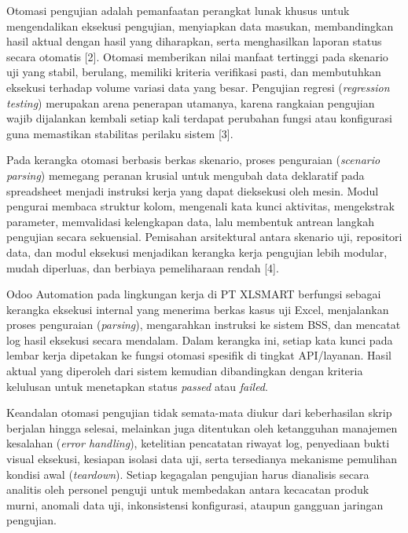 \documentclass[12pt,a4paper]{article}
\begin{document}
\clearpage
{}
Otomasi pengujian adalah pemanfaatan perangkat lunak khusus untuk mengendalikan eksekusi pengujian, menyiapkan data masukan, membandingkan hasil aktual dengan hasil yang diharapkan, serta menghasilkan laporan status secara otomatis [2]. Otomasi memberikan nilai manfaat tertinggi pada skenario uji yang stabil, berulang, memiliki kriteria verifikasi pasti, dan membutuhkan eksekusi terhadap volume variasi data yang besar. Pengujian regresi (\textit{regression testing}) merupakan arena penerapan utamanya, karena rangkaian pengujian wajib dijalankan kembali setiap kali terdapat perubahan fungsi atau konfigurasi guna memastikan stabilitas perilaku sistem [3].

Pada kerangka otomasi berbasis berkas skenario, proses penguraian (\textit{scenario parsing}) memegang peranan krusial untuk mengubah data deklaratif pada spreadsheet menjadi instruksi kerja yang dapat dieksekusi oleh mesin. Modul pengurai membaca struktur kolom, mengenali kata kunci aktivitas, mengekstrak parameter, memvalidasi kelengkapan data, lalu membentuk antrean langkah pengujian secara sekuensial. Pemisahan arsitektural antara skenario uji, repositori data, dan modul eksekusi menjadikan kerangka kerja pengujian lebih modular, mudah diperluas, dan berbiaya pemeliharaan rendah [4].

Odoo Automation pada lingkungan kerja di PT XLSMART berfungsi sebagai kerangka eksekusi internal yang menerima berkas kasus uji Excel, menjalankan proses penguraian (\textit{parsing}), mengarahkan instruksi ke sistem BSS, dan mencatat log hasil eksekusi secara mendalam. Dalam kerangka ini, setiap kata kunci pada lembar kerja dipetakan ke fungsi otomasi spesifik di tingkat API/layanan. Hasil aktual yang diperoleh dari sistem kemudian dibandingkan dengan kriteria kelulusan untuk menetapkan status \textit{passed} atau \textit{failed}.

Keandalan otomasi pengujian tidak semata-mata diukur dari keberhasilan skrip berjalan hingga selesai, melainkan juga ditentukan oleh ketangguhan manajemen kesalahan (\textit{error handling}), ketelitian pencatatan riwayat log, penyediaan bukti visual eksekusi, kesiapan isolasi data uji, serta tersedianya mekanisme pemulihan kondisi awal (\textit{teardown}). Setiap kegagalan pengujian harus dianalisis secara analitis oleh personel penguji untuk membedakan antara kecacatan produk murni, anomali data uji, inkonsistensi konfigurasi, ataupun gangguan jaringan pengujian.
\end{document}
